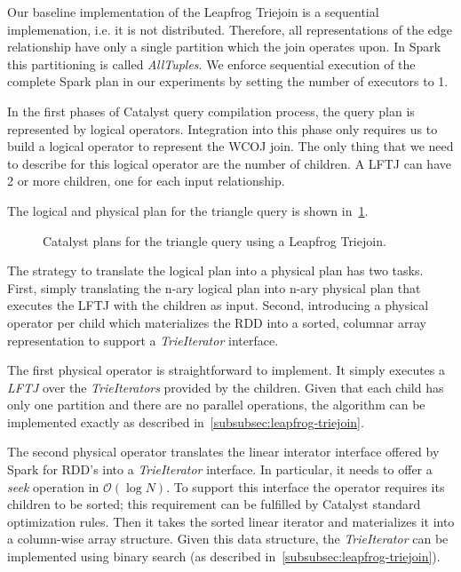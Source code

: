 Our baseline implementation of the Leapfrog Triejoin is a sequential implemenation, i.e. it is not distributed.
Therefore, all representations of the edge relationship have only a single partition which the join operates upon.
In Spark this partitioning is called \textit{AllTuples}.
We enforce sequential execution of the complete Spark plan in our experiments by setting the number of executors to 1.

In the first phases of Catalyst query compilation process, the query plan is represented by logical operators.
Integration into this phase only requires us to build a logical operator to represent the \textsc{WCOJ} join.
The only thing that we need to describe for this logical operator are the number of children.
A \textsc{LFTJ} can have 2 or more children, one for each input relationship.

The logical and physical plan for the triangle query is shown in~\cref{fig:lftj-catalyst-plan}.

\begin{figure}
    \caption{Catalyst plans for the triangle query using a Leapfrog Triejoin.}
    \label{fig:lftj-catalyst-plan}
\end{figure}

The strategy to translate the logical plan into a physical plan has two tasks.
First, simply translating the n-ary logical plan into n-ary physical plan that executes the \textsc{LFTJ} with the children as input.
Second, introducing a physical operator per child which materializes the RDD into a sorted, columnar array representation to support a
\textit{TrieIterator} interface.

The first physical operator is straightforward to implement.
It simply executes a \textit{LFTJ} over the \textit{TrieIterators} provided by the children.
Given that each child has only one partition and there are no parallel operations, the algorithm can be implemented exactly
as described in~\cref{subsubsec:leapfrog-triejoin}.

The second physical operator translates the linear interator interface offered by Spark for RDD's into a \textit{TrieIterator} interface.
In particular, it needs to offer a \textit{seek} operation in $\mathcal{O} (\log N) $.
To support this interface the operator requires its children to be sorted;
this requirement can be fulfilled by Catalyst standard optimization rules.
Then it takes the sorted linear iterator and materializes it into a column-wise array structure.
Given this data structure, the \textit{TrieIterator} can be implemented using binary search (as described
in~\cref{subsubsec:leapfrog-triejoin}).

